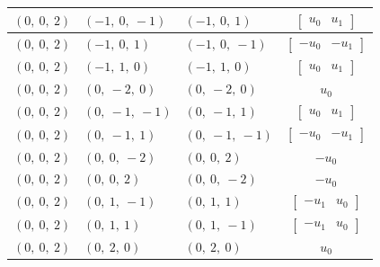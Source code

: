 \documentclass[11pt]{article}
\theoremstyle{definition}
\begin{document}
\begin{longtable}{|l|l|l|c|}
    \hline
    $\left( 0, \  0, \  2\right)$ & $\left( -1, \  0, \  -1\right)$ & $\left( -1, \  0, \  1\right)$ & $\left[\begin{matrix}u_{0} & u_{1}\end{matrix}\right]$ \\
    \hline
    $\left( 0, \  0, \  2\right)$ & $\left( -1, \  0, \  1\right)$ & $\left( -1, \  0, \  -1\right)$ & $\left[\begin{matrix}- u_{0} & - u_{1}\end{matrix}\right]$ \\
    \hline
    $\left( 0, \  0, \  2\right)$ & $\left( -1, \  1, \  0\right)$ & $\left( -1, \  1, \  0\right)$ & $\left[\begin{matrix}u_{0} & u_{1}\end{matrix}\right]$ \\
    \hline
    $\left( 0, \  0, \  2\right)$ & $\left( 0, \  -2, \  0\right)$ & $\left( 0, \  -2, \  0\right)$ & $u_{0}$ \\
    \hline
    $\left( 0, \  0, \  2\right)$ & $\left( 0, \  -1, \  -1\right)$ & $\left( 0, \  -1, \  1\right)$ & $\left[\begin{matrix}u_{0} & u_{1}\end{matrix}\right]$ \\
    \hline
    $\left( 0, \  0, \  2\right)$ & $\left( 0, \  -1, \  1\right)$ & $\left( 0, \  -1, \  -1\right)$ & $\left[\begin{matrix}- u_{0} & - u_{1}\end{matrix}\right]$ \\
    \hline
    $\left( 0, \  0, \  2\right)$ & $\left( 0, \  0, \  -2\right)$ & $\left( 0, \  0, \  2\right)$ & $- u_{0}$ \\
    \hline
    $\left( 0, \  0, \  2\right)$ & $\left( 0, \  0, \  2\right)$ & $\left( 0, \  0, \  -2\right)$ & $- u_{0}$ \\
    \hline
    $\left( 0, \  0, \  2\right)$ & $\left( 0, \  1, \  -1\right)$ & $\left( 0, \  1, \  1\right)$ & $\left[\begin{matrix}- u_{1} & u_{0}\end{matrix}\right]$ \\
    \hline
    $\left( 0, \  0, \  2\right)$ & $\left( 0, \  1, \  1\right)$ & $\left( 0, \  1, \  -1\right)$ & $\left[\begin{matrix}- u_{1} & u_{0}\end{matrix}\right]$ \\
    \hline
    $\left( 0, \  0, \  2\right)$ & $\left( 0, \  2, \  0\right)$ & $\left( 0, \  2, \  0\right)$ & $u_{0}$ \\

\end{longtable}
\end{document}
